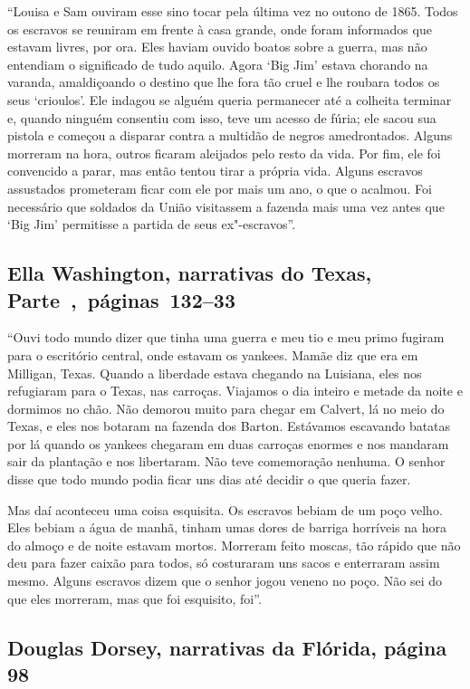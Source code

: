 ``Louisa e Sam ouviram esse sino tocar pela última vez no outono de
1865. Todos os escravos se reuniram em frente à casa grande, onde
foram informados que estavam livres, por ora. Eles haviam ouvido boatos
sobre a guerra, mas não entendiam o significado de tudo aquilo. Agora
`Big Jim' estava chorando na varanda, amaldiçoando o destino que lhe
fora tão cruel e lhe roubara todos os seus `crioulos'. Ele indagou se
alguém queria permanecer até a colheita terminar e, quando ninguém
consentiu com isso, teve um acesso de fúria; ele sacou sua pistola e
começou a disparar contra a multidão de negros amedrontados. Alguns
morreram na hora, outros ficaram aleijados pelo resto da vida. Por fim,
ele foi convencido a parar, mas então tentou tirar a própria vida.
Alguns escravos assustados prometeram ficar com ele por mais um ano, o
que o acalmou. Foi necessário que soldados da União visitassem a fazenda
mais uma vez antes que `Big Jim' permitisse a partida de seus
ex"-escravos''.

\subsection{Ella Washington, narrativas do Texas, Parte~,~páginas~132--33}
\label{ref279}

``Ouvi todo mundo dizer que tinha uma guerra e meu tio e meu primo
fugiram para o escritório central, onde estavam os yankees. Mamãe diz
que era em Milligan, Texas. Quando a liberdade estava chegando na
Luisiana, eles nos refugiaram para o Texas, nas carroças. Viajamos o dia
inteiro e metade da noite e dormimos no chão. Não demorou muito para
chegar em Calvert, lá no meio do Texas, e eles nos botaram na fazenda
dos Barton. Estávamos escavando batatas por lá quando os yankees
chegaram em duas carroças enormes e nos mandaram sair da plantação e nos
libertaram. Não teve comemoração nenhuma. O senhor disse que todo mundo
podia ficar uns dias até decidir o que queria fazer.

Mas daí aconteceu uma coisa esquisita. Os escravos bebiam de um poço
velho. Eles bebiam a água de manhã, tinham umas dores de barriga
horríveis na hora do almoço e de noite estavam mortos. Morreram feito
moscas, tão rápido que não deu para fazer caixão para todos, só
costuraram uns sacos e enterraram assim mesmo. Alguns escravos dizem que
o senhor jogou veneno no poço. Não sei do que eles morreram, mas que foi
esquisito, foi''.

\subsection{Douglas Dorsey, narrativas da Flórida, página 98} \label{ref72}

